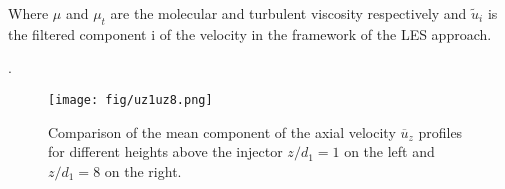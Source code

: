 \documentclass[twocolumn,10pt]{asme2e}
\begin{document}
Where $\mu$ and $\mu_t$ are the molecular and turbulent viscosity respectively and $\tilde{u}_i$ is the filtered component i of the velocity in the framework of the LES approach.


.%
\begin{figure}
       \centering
       \texttt{[image: fig/uz1uz8.png]}
   \caption{Comparison of the mean component of the axial velocity $\overline{u}_z$ profiles for different heights above the injector $z/d_1=1$ on the left and $z/d_1=8$ on the right.}
   \label{fig:profiles-uz}
\end{figure}
\end{document}
